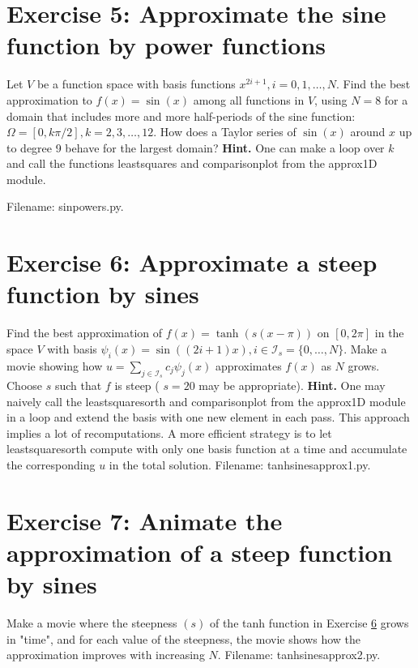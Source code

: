 \documentclass[../main.tex]{subfiles}
\begin{document}
	\section*{Exercise 5: Approximate the sine function by power functions}
	\label{sec:sec_10_5}
	\noindent Let $V$ be a function space with basis functions $x^{2 i+1}, i=0,1, \ldots, N$. Find the best approximation to $f(x)=\sin (x)$ among all functions in $V$, using $N=8$ for a domain that includes more and more half-periods of the sine function: $\Omega=[0, k \pi / 2], k=2,3, \ldots, 12$. How does a Taylor series of $\sin (x)$ around $x$ up to degree 9 behave for the largest domain?
	\bigbreak
	\noindent \textbf{Hint.} One can make a loop over $k$ and call the functions least\textunderscore squares and comparison\textunderscore plot from the approx1D module.
	
	Filename: sin\textunderscore powers.py.
	\bigbreak
	\section*{Exercise 6: Approximate a steep function by sines}
	\label{sec:sec_10_6}
	\noindent Find the best approximation of $f(x)=\tanh (s(x-\pi))$ on $[0,2 \pi]$ in the space $V$ with basis $\psi_{i}(x)=\sin ((2 i+1) x), i \in \mathcal{I}_{s}=\{0, \ldots, N\}$. Make a movie showing how $u=\sum_{j \in \mathcal{I}_{s}} c_{j} \psi_{j}(x)$ approximates $f(x)$ as $N$ grows. Choose $s$ such that $f$ is steep ( $s=20$ may be appropriate).
	\bigbreak
	\noindent \textbf{Hint.} One may naively call the least\textunderscore squares\textunderscore orth and comparison\textunderscore plot from the approx1D module in a loop and extend the basis with one new element in each pass. This approach implies a lot of recomputations. A more efficient strategy is to let least\textunderscore squares\textunderscore orth compute with only one basis function at a time and accumulate the corresponding $u$ in the total solution.
	Filename: tanh\textunderscore sines\textunderscore approx1.py.
	\bigbreak
	\section*{Exercise 7: Animate the approximation of a steep function by sines}
	\label{sec:sec_10_7}
	\noindent Make a movie where the steepness $(s)$ of the tanh function in Exercise \hyperref[sec:sec_10_6]{6} grows in "time", and for each value of the steepness, the movie shows how the approximation improves with increasing $N$. Filename: tanh\textunderscore sines\textunderscore approx2.py.
	\bigbreak
\end{document}
